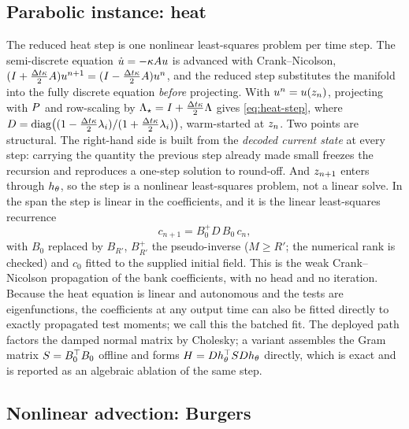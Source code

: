 \subsection{Parabolic instance: heat}
\label{app:method:heat}

The reduced heat step is one nonlinear least-squares problem per time
step. The semi-discrete equation $\dot u=-\kappa A u$ is advanced with
Crank--Nicolson,
$(I+\tfrac{\Delta t\kappa}{2}A)u^{n+1}=(I-\tfrac{\Delta t\kappa}{2}A)u^{n}$,
and the reduced step substitutes the manifold into the fully discrete equation
\emph{before} projecting. With $u^{n}=u(z_n)$, projecting with
$P$ and row-scaling by $\Lambda_\star=I+\tfrac{\Delta t\kappa}{2}\Lambda$
gives \eqref{eq:heat-step},
where $D=\operatorname{diag}\!\left((1-\tfrac{\Delta t\kappa}{2}\lambda_i)/(1+\tfrac{\Delta t\kappa}{2}\lambda_i)\right)$,
warm-started at $z_n$. Two points are structural. The right-hand side is built from
the \emph{decoded current state} at every step: carrying the quantity the
previous step already made small freezes the recursion and reproduces a
one-step solution to round-off. And $z_{n+1}$ enters through $h_\theta$, so
the step is a nonlinear least-squares problem, not a linear solve.
In the span the step is linear in the coefficients, and it is the linear
least-squares recurrence
\begin{equation}
  c_{n+1}=B_0^{+}D\,B_0\,c_n,
  \label{eq:heat-endpoint}
\end{equation}
with $B_0$ replaced by $B_{R'}$, $B_{R'}^{+}$ the pseudo-inverse ($M\ge R'$;
the numerical rank is checked) and $c_0$ fitted to the supplied initial
field. This is the weak Crank--Nicolson propagation of the bank
coefficients, with no head and no iteration. Because the heat equation is
linear and autonomous and the tests are eigenfunctions, the coefficients
at any output time can also be fitted directly to exactly propagated test
moments; we call this the batched fit. The deployed
path factors the damped normal matrix by Cholesky; a variant assembles the Gram
matrix $S=B_0^{\top} B_0$ offline and forms $H=Dh_\theta^{\top} SDh_\theta$ directly, which is
exact and is reported as an algebraic ablation of the same step.

\subsection{Nonlinear advection: Burgers}
\label{app:method:burgers}

